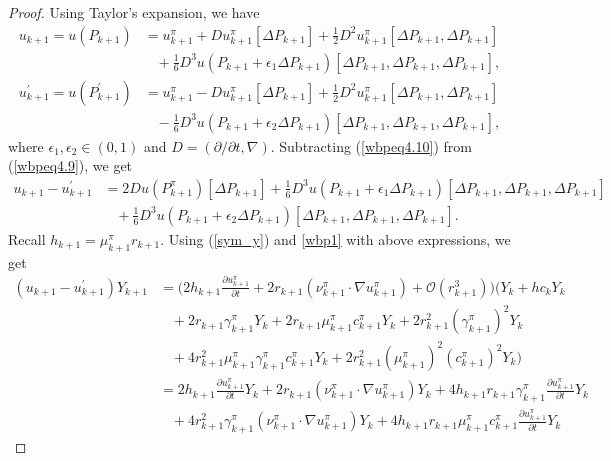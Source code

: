 \documentclass[10pt,a4paper]{amsart}
\begin{document}
\begin{proof}


 Using Taylor's expansion, we have
\begin{align}
    u_{k+1} = u(P_{k+1}) &= u^{\pi}_{k+1} + Du_{k+1}^{\pi}[\Delta P_{k+1}] + \frac{1}{2}D^{2}u_{k+1}^{\pi}[\Delta P_{k+1},\Delta P_{k+1} ] \nonumber \\ & \;\;\; +\frac{1}{6} D^{3}u(P_{k+1} + \epsilon_{1}\Delta P_{k+1})[\Delta P_{k+1},\Delta P_{k+1}, \Delta P_{k+1} ],\label{wbpeq4.9}\\ 
    u_{k+1}^{'} = u(P_{k+1}^{'}) &= u_{k+1}^{\pi} - Du_{k+1}^{\pi}[\Delta P_{k+1}]+  \frac{1}{2}D^{2}u_{k+1}^{\pi}[\Delta P_{k+1},\Delta P_{k+1} ] \nonumber \\ & \;\;\; - \frac{1}{6}D^{3}u(P_{k+1} + \epsilon_{2}\Delta P_{k+1})[\Delta P_{k+1},\Delta P_{k+1}, \Delta P_{k+1} ], \label{wbpeq4.10}
\end{align}
where $\epsilon_{1}, \epsilon_{2} \in (0,1)$ and $D = (\partial/\partial t, \nabla)$. Subtracting (\ref{wbpeq4.10}) from (\ref{wbpeq4.9}), we get
\begin{align}
u_{k+1} - u_{k+1}^{'} &= 2 Du(P_{k+1}^{\pi})[\Delta P_{k+1}]+\frac{1}{6} D^{3}u(P_{k+1} + \epsilon_{1}\Delta P_{k+1})[\Delta P_{k+1},\Delta P_{k+1}, \Delta P_{k+1}] \nonumber \\ & \;\;\; + \frac{1}{6}D^{3}u(P_{k+1} + \epsilon_{2}\Delta P_{k+1})[\Delta P_{k+1},\Delta P_{k+1}, \Delta P_{k+1} ].  
\end{align}
Recall $h_{k+1} = \mu_{k+1}^{\pi} r_{k+1} $. Using (\ref{sym_y}) and \eqref{wbp1} with above expressions, we get
\begin{align}
(u_{k+1} - u_{k+1}^{'})Y_{k+1} &= \Big(2 h_{k+1}\frac{\partial u_{k+1}^{\pi}}{\partial t} + 2r_{k+1}(\nu_{k+1}^{\pi} \cdot \nabla u_{k+1}^{\pi}) + \mathcal{O}(r_{k+1}^{3})\Big) \Big(Y_{k}+ hc_kY_k \nonumber \\ &  \;\;\; + 2r_{k+1}\gamma_{k+1}^{\pi}Y_{k}   + 2r_{k+1}\mu_{k+1}^{\pi}c^{\pi}_{k+1}Y_{k} + 2r_{k+1}^{2}(\gamma_{k+1}^{\pi})^{2}Y_{k}  \nonumber  \\& \;\;\; + 4r_{k+1}^{2}\mu_{k+1}^{\pi}\gamma_{k+1}^{\pi} c_{k+1}^{\pi}Y_{k} + 2r_{k+1}^{2}(\mu_{k+1}^{\pi})^{2}(c_{k+1}^{\pi})^{2}Y_{k} \Big)
\nonumber \\ &  
= 2h_{k+1}\frac{\partial u_{k+1}^{\pi}}{\partial t}Y_{k} + 2r_{k+1}(\nu_{k+1}^{\pi} \cdot \nabla u_{k+1}^{\pi})Y_{k} + 4h_{k+1}r_{k+1}\gamma_{k+1}^{\pi}\frac{\partial u_{k+1}^{\pi}}{\partial t}Y_{k} 
\nonumber \\ & \;\;\;
+ 4r_{k+1}^{2}\gamma_{k+1}^{\pi} (\nu_{k+1}^{\pi} \cdot \nabla  u_{k+1}^{\pi}) Y_{k}   + 4h_{k+1}r_{k+1}\mu_{k+1}^{\pi}c_{k+1}^{\pi}\frac{\partial u_{k+1}^{\pi}}{\partial t}Y_{k} 

\end{align}
\end{proof}
\end{document}
